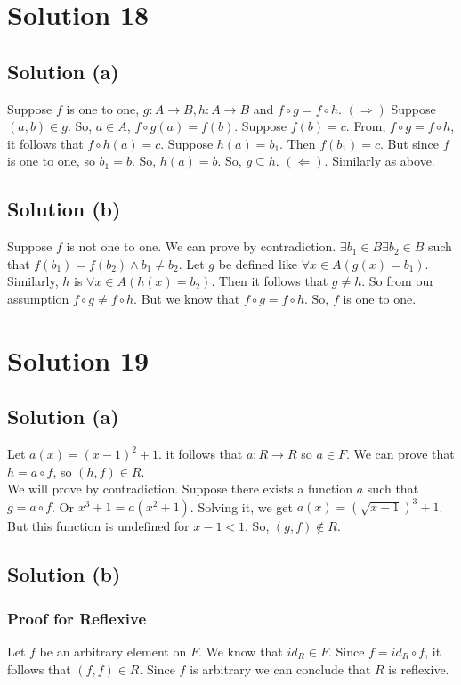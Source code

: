 \documentclass{article}
\begin{document}
\section{Solution 18}
\subsection{Solution (a)}
Suppose $f$ is one to one, $g:A \to B, h: A \to B$ and $f \circ g = f
\circ h$.
$(\Rightarrow)$ Suppose $(a,b) \in g$. So, $a \in A$, $f \circ g(a) =
f(b)$. Suppose $f(b) = c$. From, $f \circ g = f \circ h$, it follows
that $f \circ h(a) = c$. Suppose $h(a) = b_1$. Then $f(b_1) = c$. But
since $f$ is one to one, so $b_1 = b$. So, $h(a) = b$. So, $g
\subseteq h$.
$(\Leftarrow)$. Similarly as above.

\subsection{Solution (b)}
Suppose $f$ is not one to one. We can prove by contradiction. $\exists
b_1 \in B \exists b_2 \in B$ such that $f(b_1) = f(b_2) \land b_1 \neq
b_2$. Let $g$ be defined like $\forall x \in A(g(x) = b_1)$.
Similarly, $h$ is $\forall x \in A(h(x) = b_2)$. Then it follows that
$g \neq h$. So from our assumption $f \circ g \neq f \circ h$. But we
know that $f \circ g = f \circ h$. So, $f$ is one to one.

\section{Solution 19}
\subsection{Solution (a)}
Let $a(x) = (x-1)^2 + 1$. it follows that $a : R \to R$ so $a \in F$.
We can prove that $h = a \circ f$, so $(h,f) \in R$. \\
We will prove by contradiction. Suppose there exists a function $a$
such that $g = a \circ f$. Or $x^3 + 1 = a(x^2 + 1)$. Solving it, we
get $a(x) = (\sqrt{x - 1})^3 + 1$. But this function is undefined for
$x - 1 < 1$. So, $(g,f) \notin R$.

\subsection{Solution (b)}
\subsubsection{Proof for Reflexive}
Let $f$ be an arbitrary element on $F$. We know that $id_R \in F$.
Since $f = id_R \circ f$, it follows that $(f,f) \in R$. Since $f$ is
arbitrary we can conclude that $R$ is reflexive.
\end{document}
